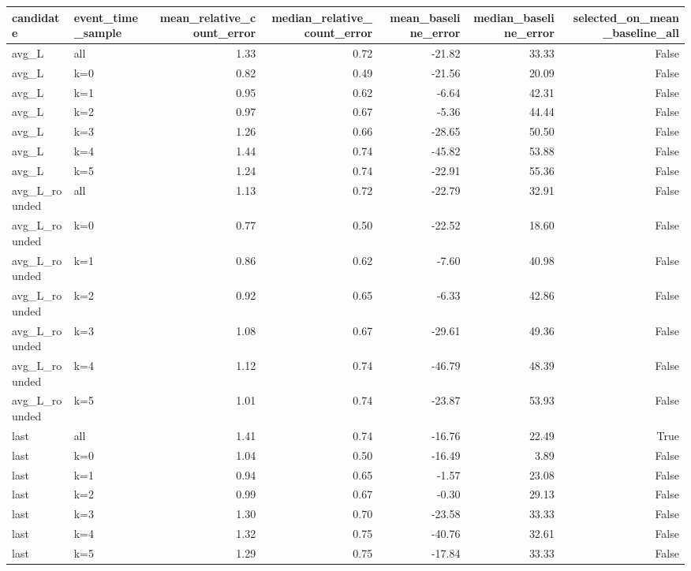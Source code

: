 \begin{tabular}{llrrrrr}
\toprule
candidate & event_time_sample & mean_relative_count_error & median_relative_count_error & mean_baseline_error & median_baseline_error & selected_on_mean_baseline_all \\
\midrule
avg_L & all & 1.33 & 0.72 & -21.82 & 33.33 & False \\
avg_L & k=0 & 0.82 & 0.49 & -21.56 & 20.09 & False \\
avg_L & k=1 & 0.95 & 0.62 & -6.64 & 42.31 & False \\
avg_L & k=2 & 0.97 & 0.67 & -5.36 & 44.44 & False \\
avg_L & k=3 & 1.26 & 0.66 & -28.65 & 50.50 & False \\
avg_L & k=4 & 1.44 & 0.74 & -45.82 & 53.88 & False \\
avg_L & k=5 & 1.24 & 0.74 & -22.91 & 55.36 & False \\
avg_L_rounded & all & 1.13 & 0.72 & -22.79 & 32.91 & False \\
avg_L_rounded & k=0 & 0.77 & 0.50 & -22.52 & 18.60 & False \\
avg_L_rounded & k=1 & 0.86 & 0.62 & -7.60 & 40.98 & False \\
avg_L_rounded & k=2 & 0.92 & 0.65 & -6.33 & 42.86 & False \\
avg_L_rounded & k=3 & 1.08 & 0.67 & -29.61 & 49.36 & False \\
avg_L_rounded & k=4 & 1.12 & 0.74 & -46.79 & 48.39 & False \\
avg_L_rounded & k=5 & 1.01 & 0.74 & -23.87 & 53.93 & False \\
last & all & 1.41 & 0.74 & -16.76 & 22.49 & True \\
last & k=0 & 1.04 & 0.50 & -16.49 & 3.89 & False \\
last & k=1 & 0.94 & 0.65 & -1.57 & 23.08 & False \\
last & k=2 & 0.99 & 0.67 & -0.30 & 29.13 & False \\
last & k=3 & 1.30 & 0.70 & -23.58 & 33.33 & False \\
last & k=4 & 1.32 & 0.75 & -40.76 & 32.61 & False \\
last & k=5 & 1.29 & 0.75 & -17.84 & 33.33 & False \\
\bottomrule
\end{tabular}
